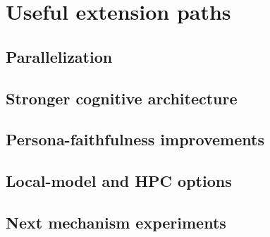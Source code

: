 \documentclass[pdflatex,sn-mathphys-num]{sn-jnl}%
\theoremstyle{thmstyleone}%
\theoremstyle{thmstyletwo}%
\theoremstyle{thmstylethree}%
\begin{document}
\section{Useful extension paths}\label{sec:si-extensions}

\subsection{Parallelization}\label{subsec:si-ext-parallel}

\subsection{Stronger cognitive architecture}\label{subsec:si-ext-cognition}

\subsection{Persona-faithfulness improvements}\label{subsec:si-ext-persona}

\subsection{Local-model and HPC options}\label{subsec:si-ext-local}

\subsection{Next mechanism experiments}\label{subsec:si-ext-mechanisms}
\end{document}
